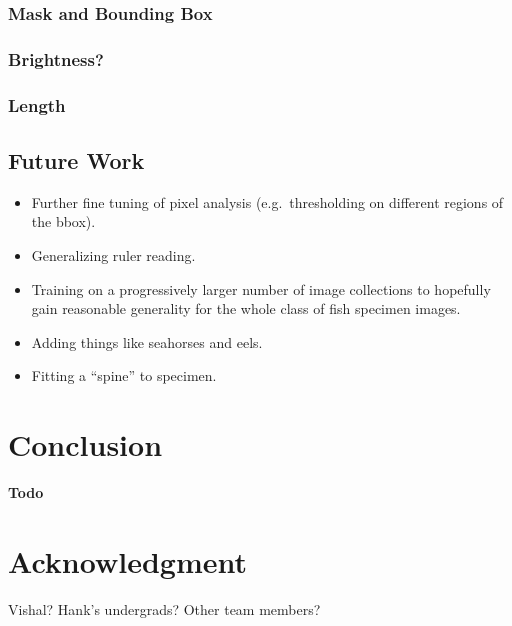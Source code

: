 \documentclass[conference]{IEEEtran}
\begin{document}
\subsubsection{Mask and Bounding Box}

\subsubsection{Brightness?}

\subsubsection{Length}

\subsection{Future Work}
\begin{itemize}
    \item Further fine tuning of pixel analysis (e.g.\ thresholding on different regions of the bbox).
    \item Generalizing ruler reading.
    \item Training on a progressively larger number of image collections to hopefully gain reasonable generality for the whole class of fish specimen images.
    \item Adding things like seahorses and eels.
    \item Fitting a ``spine'' to specimen.
\end{itemize}
\section{Conclusion}
\textbf{Todo}

\section*{Acknowledgment}

Vishal? Hank's undergrads? Other team members?



\end{document}
